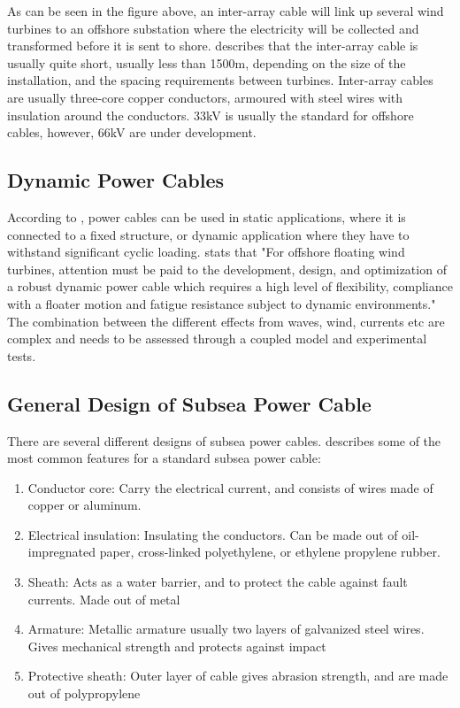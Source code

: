 \noindent As can be seen in the figure above, an inter-array cable will link up several wind turbines to an offshore substation where the electricity will be collected and transformed before it is sent to shore. \cite{srinil2016} describes that the inter-array cable is usually quite short, usually less than 1500m, depending on the size of the installation, and the spacing requirements between turbines. Inter-array cables are usually three-core copper conductors, armoured with steel wires with insulation around the conductors. 33kV is usually the standard for offshore cables, however, 66kV are under development. \newline
\newline
  
  \subsection{Dynamic Power Cables}
According to \cite{Thies2012}, power cables can be used in static applications, where it is connected to a fixed structure, or dynamic application where they have to withstand significant cyclic loading. \cite{srinil2016} stats that "For offshore floating wind turbines, attention must be paid to the development, design, and optimization of a robust dynamic power cable which requires a high level of flexibility, compliance with a floater motion and fatigue resistance subject to dynamic environments." The combination between the different effects from waves, wind, currents etc are complex and needs to be assessed through a coupled model and experimental tests. 

\subsection{General Design of Subsea Power Cable}
There are several different designs of subsea power cables. \cite{Thies2012} describes some of the most common features for a standard subsea power cable: 

\begin{enumerate}[label=\Alph*]
\item Conductor core: Carry the electrical current, and consists of wires made of copper or aluminum. 
\item Electrical insulation: Insulating the conductors. Can be made out of oil-impregnated paper, cross-linked polyethylene, or ethylene propylene rubber.
\item Sheath: Acts as a water barrier, and to protect the cable against fault currents. Made out of metal
\item Armature: Metallic armature usually two layers of galvanized steel wires. Gives mechanical strength and protects against impact
\item Protective sheath: Outer layer of cable gives abrasion strength, and are made out of polypropylene
\end{enumerate}

